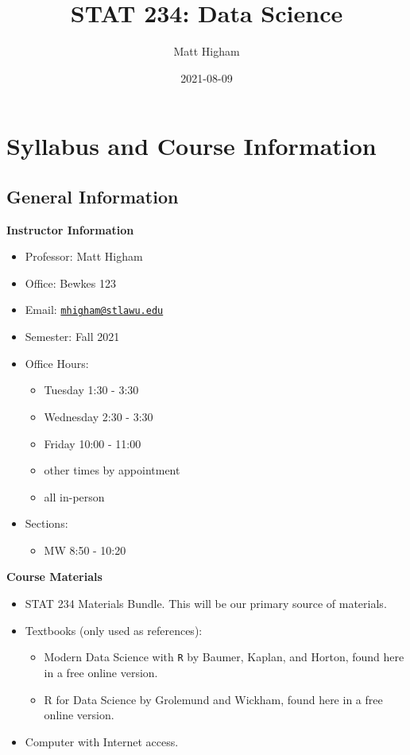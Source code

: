\documentclass[
]{book}
\title{STAT 234: Data Science}
\author{Matt Higham}
\date{2021-08-09}
\providecommand{\tightlist}{%
  \setlength{\itemsep}{0pt}\setlength{\parskip}{0pt}}
\begin{document}
\maketitle

{
\setcounter{tocdepth}{1}
\tableofcontents
}
\hypertarget{syllabus-and-course-information}{%
\chapter{Syllabus and Course Information}\label{syllabus-and-course-information}}

\hypertarget{general-information}{%
\section{General Information}\label{general-information}}

\textbf{Instructor Information}

\begin{itemize}
\tightlist
\item
  Professor: Matt Higham
\item
  Office: Bewkes 123
\item
  Email: \href{mailto:mhigham@stlawu.edu}{\nolinkurl{mhigham@stlawu.edu}}
\item
  Semester: Fall 2021
\item
  Office Hours:

  \begin{itemize}
  \tightlist
  \item
    Tuesday 1:30 - 3:30
  \item
    Wednesday 2:30 - 3:30
  \item
    Friday 10:00 - 11:00
  \item
    other times by appointment
  \item
    all in-person
  \end{itemize}
\item
  Sections:

  \begin{itemize}
  \tightlist
  \item
    MW 8:50 - 10:20
  \end{itemize}
\end{itemize}

\textbf{Course Materials}

\begin{itemize}
\tightlist
\item
  STAT 234 Materials Bundle. This will be our primary source of materials.
\item
  Textbooks (only used as references):

  \begin{itemize}
  \tightlist
  \item
    Modern Data Science with \texttt{R} by Baumer, Kaplan, and Horton, found here in a free online version.
  \item
    R for Data Science by Grolemund and Wickham, found here in a free online version.
  \end{itemize}
\item
  Computer with Internet access.
\end{itemize}
\end{document}
